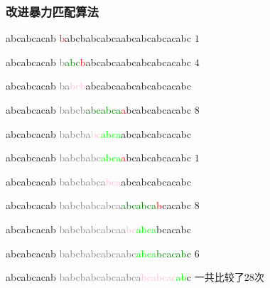 \documentclass{ctexbeamer}
\newcommand{\red}[1]{\textcolor{red}{#1}}
\newcommand{\pink}[1]{\textcolor{pink}{#1}}
\newcommand{\green}[1]{\textcolor{green}{#1}}
\newcommand{\gray}[1]{\textcolor{gray}{#1}}
\newcommand{\lime}[1]{\textcolor{lime}{#1}}
\begin{document}
\begin{frame}[fragile]
\frametitle{改进暴力匹配算法}

\begin{tverb}[frame=bottomline, fontsize=\small]
abcabcacab
\red{b}abcbabcabcaabcabcabcacabc \(1\)
\end{tverb}

	\begin{tverb}[frame=bottomline, fontsize=\small]
 abcabcacab
\gray{b}\green{abc}\red{b}abcabcaabcabcabcacabc \(4\)
	\end{tverb}

\begin{tverb}[frame=bottomline, fontsize=\small]
     abcabcacab
\gray{ba}\pink{bcb}abcabcaabcabcabcacabc
\end{tverb}

\begin{tverb}[frame=bottomline, fontsize=\small]
     abcabcacab
\gray{babcb}\green{abcabca}\red{a}bcabcabcacabc \(8\)
\end{tverb}

\begin{tverb}[frame=bottomline, fontsize=\small]
        abcabcacab
\gray{babcba}\pink{bc}\lime{abca}abcabcabcacabc
\end{tverb}

\begin{tverb}[frame=bottomline, fontsize=\small]
        abcabcacab
\gray{babcbabc}\lime{abca}\red{a}bcabcabcacabc \(1\)
\end{tverb}

\begin{tverb}[frame=bottomline, fontsize=\small]
            abcabcacab
\gray{babcbabca}\pink{bca}abcabcabcacabc
\end{tverb}

\begin{tverb}[frame=bottomline, fontsize=\small]
            abcabcacab
\gray{babcbabcabca}\green{abcabca}\red{b}cacabc \(8\)
\end{tverb}

\begin{tverb}[frame=bottomline, fontsize=\small]
               abcabcacab
\gray{babcbabcabcaa}\pink{bc}\lime{abca}bcacabc
\end{tverb}

\begin{tverb}[frame=bottomline, fontsize=\small]
               abcabcacab
\gray{babcbabcabcaabc}\lime{abca}\green{bcacab}c \(6\)
\end{tverb}

\begin{tverb}[frame=bottomline, fontsize=\small]
                       abcabcacab
\gray{babcbabcabcaabca}\pink{bcabcac}\lime{ab}c           一共比较了\(28\)次
\end{tverb}

\end{frame}
\end{document}
